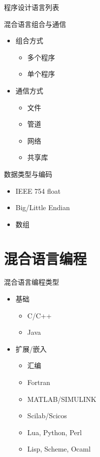 \begin{frame}{程序设计语言列表}
\begin{center}\end{center}
\end{frame}

\begin{frame}{混合语言组合与通信}
\begin{itemize}
\item 组合方式
\begin{itemize}
\item 多个程序
\item 单个程序
\end{itemize}
\item 通信方式
\begin{itemize}
\item 文件
\item 管道
\item 网络
\item 共享库
\end{itemize}
\end{itemize}
\end{frame}



\begin{frame}{数据类型与编码}
\begin{itemize}
\item IEEE 754 float
\item Big/Little Endian
\item 数组
\end{itemize}
\end{frame}


\section{混合语言编程}
\begin{frame}{混合语言编程类型}
\begin{itemize}
\item 基础
\begin{itemize}
\item C/C++
\item Java
\end{itemize}
\item 扩展/嵌入
\begin{itemize}
\item 汇编
\item Fortran
\item MATLAB/SIMULINK
\item Scilab/Scicos
\item Lua, Python, Perl
\item Lisp, Scheme, Ocaml
\end{itemize}
\end{itemize}
\end{frame}

